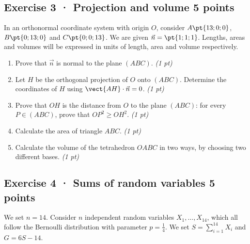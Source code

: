 \mxnewpage{}

\subsection*{Exercise 3 · Projection and volume \hfill 5 points}In an orthonormal coordinate system with origin $O$, consider $A\pt{13;0;0}$, $B\pt{0;13;0}$ and $C\pt{0;0;13}$. We are given $\vec n=\pt{1;1;1}$. Lengths, areas and volumes will be expressed in units of length, area and volume respectively.

\begin{enumerate}

\item Prove that $\vec n$ is normal to the plane $(ABC)$. \hfill\textit{(1 pt)}

\item Let $H$ be the orthogonal projection of $O$ onto $(ABC)$. Determine the coordinates of $H$ using $\vect{AH}\cdot\vec n=0$. \hfill\textit{(1 pt)}

\item Prove that $OH$ is the distance from $O$ to the plane $(ABC)$: for every $P\in(ABC)$, prove that $OP^2\ge OH^2$. \hfill\textit{(1 pt)}

\item Calculate the area of triangle $ABC$. \hfill\textit{(1 pt)}

\item Calculate the volume of the tetrahedron $OABC$ in two ways, by choosing two different bases. \hfill\textit{(1 pt)}

\end{enumerate}

\subsection*{Exercise 4 · Sums of random variables \hfill 5 points}We set $n=14$. Consider $n$ independent random variables $X_1,\ldots,X_{14}$, which all follow the Bernoulli distribution with parameter $p=\frac{1}{4}$. We set $S=\displaystyle\sum_{i=1}^{14}X_i$ and $G=6S-14$.

